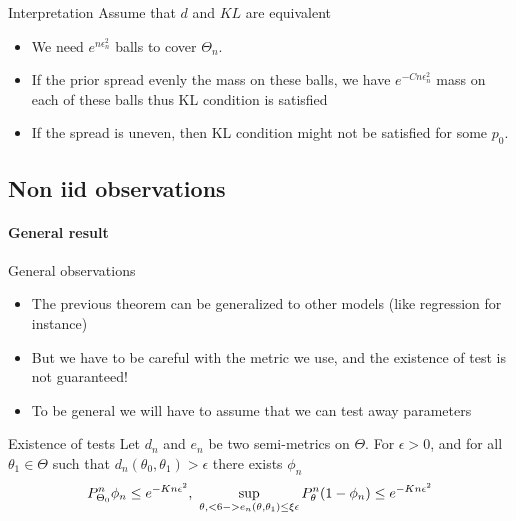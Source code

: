 \begin{block}{Interpretation}
Assume that $d$ and $KL$ are equivalent
\begin{itemize}
\item We need $e^{n\epsilon_n^2}$ balls to cover $\Theta_n$. 
\item If the prior spread evenly the mass on these balls, we have $e^{-Cn\epsilon_n^2}$ mass on each of these balls thus KL condition is satisfied
\item If the spread is uneven, then KL condition might not be satisfied for some $p_0$. 
\end{itemize}
\end{block}







\subsection[Non iid case]{Non iid  observations}




\paragraph{General result}




{General observations}

\begin{itemize}
\item The previous theorem can be generalized to other models (like regression for instance)
\item But we have to be careful with the metric we use, and the existence of test is not guaranteed! 
\item To be general we will have to assume that we can test away parameters
\end{itemize}
 
\begin{block}{Existence of tests}
Let $d_n$ and $e_n$ be two semi-metrics on $\Theta$. For $\epsilon >0$, and for all $\theta_1 \in \Theta$ such that \alert<6->{$d_n(\theta_0,\theta_1)> \epsilon$} there exists $\phi_n$ 
$$
P_{\Theta_0}^n  \phi_n \leq e^{-Kn\epsilon^2}, ~ \sup_{\theta, <6->{e_n(\theta,\theta_1)\leq \xi \epsilon}} P_{\theta}^n (1-\phi_n) \leq e^{-Kn\epsilon^2}
$$
\end{block}







